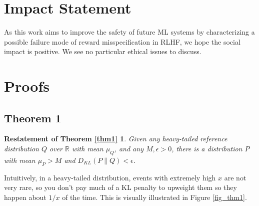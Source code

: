 \documentclass{article}
\begin{document}
\section*{Impact Statement}

As this work aims to improve the safety of future ML systems by characterizing a possible failure mode of reward misspecification in RLHF, we hope the social impact is positive. We see no particular ethical issues to discuss.

\small{
}



\appendix

\renewcommand\thefigure{\thesection.\arabic{figure}}    
\setcounter{figure}{0}

\renewcommand\thetable{\thesection.\arabic{table}}
\setcounter{table}{0}

\hypertarget{appendix}{%
\section{Proofs}\label{appendix}}

\subsection{Theorem 1}
\newtheorem*{theorem1}{Restatement of Theorem \ref{thm1}}
\begin{theorem1} Given any heavy-tailed reference distribution
\(Q\) over \(\mathbb R\) with mean \(\mu_Q\), and any
\(M, \epsilon > 0\), there is a distribution \(P\) with mean \(\mu_P>M\)
and \(D_{KL}(P \| Q) < \epsilon\).
\end{theorem1}

Intuitively, in a heavy-tailed distribution, events with extremely high $x$ are not very rare, so you don’t pay much of a KL penalty to upweight them so they happen about $1/x$ of the time. This is visually illustrated in Figure \ref{fig_thm1}.
\end{document}
